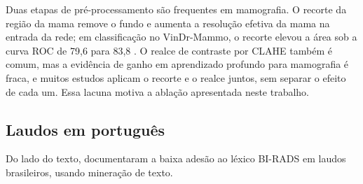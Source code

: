 Duas etapas de pré-processamento são frequentes em mamografia. O recorte da região da mama remove o fundo e aumenta a resolução efetiva da mama na entrada da rede; em classificação no VinDr-Mammo, o recorte elevou a área sob a curva ROC de 79,6 para 83,8 \cite{ibragimov2024mamt4}. O realce de contraste por CLAHE \cite{zuiderveld1994clahe} também é comum, mas a evidência de ganho em aprendizado profundo para mamografia é fraca, e muitos estudos aplicam o recorte e o realce juntos, sem separar o efeito de cada um.  Essa lacuna motiva a ablação apresentada neste trabalho.

\subsection{Laudos em português}

Do lado do texto,  documentaram a baixa adesão ao léxico BI-RADS em laudos brasileiros, usando mineração de texto. 
